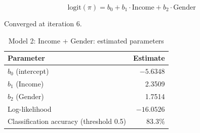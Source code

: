 \documentclass[12pt,a4paper]{article}
\begin{document}
\[
  \text{logit}(\pi) = b_0 + b_1 \cdot \text{Income} + b_2 \cdot \text{Gender}
\]

Converged at iteration 6.

\begin{table}[H]
\centering
\caption{Model 2: Income + Gender: estimated parameters}
\begin{tabular}{lr}
\toprule
Parameter & Estimate \\
\midrule
$b_0$ (intercept)   & $-5.6348$ \\
$b_1$ (Income)      &  2.3509  \\
$b_2$ (Gender)      &  1.7514  \\
\midrule
Log-likelihood & $-16.0526$ \\
Classification accuracy (threshold 0.5) & 83.3\% \\
\bottomrule
\end{tabular}
\end{table}
\end{document}
